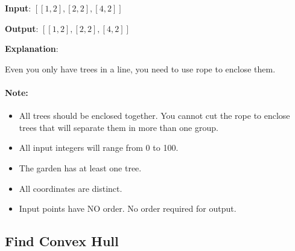\begin{flushleft}

\textbf{Input}: $[[1,2],[2,2],[4,2]]$

\textbf{Output}: $[[1,2],[2,2],[4,2]]$

\textbf{Explanation}:

Even you only have trees in a line, you need to use rope to enclose them. 

\begin{figure}[H]
\end{figure} 

\end{flushleft}

\paragraph{Note:}

\begin{itemize}
\item All trees should be enclosed together. You cannot cut the rope to enclose trees that will separate them in more than one group.
\item All input integers will range from 0 to 100.
\item The garden has at least one tree.
\item All coordinates are distinct.
\item Input points have NO order. No order required for output.
\end{itemize}

\subsection{Find Convex Hull}